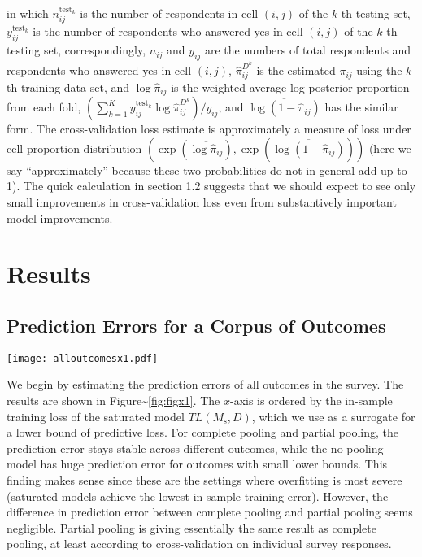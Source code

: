 \noindent in which \(n_{ij}^{\text{test}_k}\) is the number of
respondents in cell \((i,j)\) of the \(k\)-th testing set,
\(y_{ij}^{\text{test}_k}\) is the number of respondents who answered yes
in cell \((i,j)\) of the \(k\)-th testing set, correspondingly,
\(n_{ij}\) and \(y_{ij}\) are the numbers of total respondents and
respondents who answered yes in cell \((i,j)\), \(\hat\pi_{ij}^{D^k}\)
is the estimated \(\pi_{ij}\) using the \(k\)-th training data set, and
\(\overline{\log\hat\pi_{ij}}\) is the weighted average log posterior
proportion from each fold,
\(\left(\sum_{k=1}^Ky^{\text{test}_k}_{ij}\log\hat\pi_{ij}^{D^k} \right)\big/y_{ij}\),
and \(\overline{\log(1-\hat\pi_{ij})}\) has the similar form. The
cross-validation loss estimate is approximately a measure of loss under
cell proportion distribution
\((\exp(\overline{\log\hat\pi_{ij}}), \exp(\overline{\log(1-\hat\pi_{ij})}))\)
(here we say ``approximately'' because these two probabilities do not in
general add up to 1). The quick calculation in section 1.2 suggests that
we should expect to see only small improvements in cross-validation loss
even from substantively important model improvements.

\section{Results}\label{results}

\subsection{Prediction Errors for a Corpus of
Outcomes}\label{prediction-errors-for-a-corpus-of-outcomes}

\begin{figure*}[p!]
  \centering
  \texttt{[image: alloutcomesx1.pdf]}
  \caption{\em Measure of fit (estimated prediction error) for all response outcomes
    in the 2006 Cooperative Congressional Election Survey. Outcomes are ordered by the lower bound
    (in-sample loss of the saturated model). The no pooling model
    gives a bad fit.  Partial pooling does best but in most cases is almost indistinguishable from complete pooling under the cross-validation criterion.}
  \label{fig:figx1}
\end{figure*}

We begin by estimating the prediction errors of all outcomes in the
survey. The results are shown in Figure\textasciitilde{}\ref{fig:figx1}.
The \(x\)-axis is ordered by the in-sample training loss of the
saturated model \(TL(M_{\text{s}},D)\), which we use as a surrogate for
a lower bound of predictive loss. For complete pooling and partial
pooling, the prediction error stays stable across different outcomes,
while the no pooling model has huge prediction error for outcomes with
small lower bounds. This finding makes sense since these are the
settings where overfitting is most severe (saturated models achieve the
lowest in-sample training error). However, the difference in prediction
error between complete pooling and partial pooling seems negligible.
Partial pooling is giving essentially the same result as complete
pooling, at least according to cross-validation on individual survey
responses.

